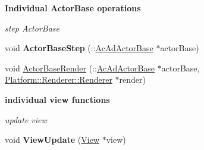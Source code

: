\begin{Indent}{\bf Individual ActorBase operations}\par
{\em \label{_amgrpbbc3c30f8b1ae7bdeff2a0b529da0242}
 step ActorBase }\begin{DoxyCompactItemize}
\item 
\hypertarget{classContent_1_1Scene_a183cddc9f57e3f2aae50197ae788e121}{
void {\bfseries ActorBaseStep} (::\hyperlink{classContent_1_1Actor_1_1Admin_1_1ActorBase}{AcAdActorBase} $\ast$actorBase)}
\label{classContent_1_1Scene_a183cddc9f57e3f2aae50197ae788e121}

\item 
void \hyperlink{classContent_1_1Scene_aa23a026de11723b0e67eeb7bf46a08c7}{ActorBaseRender} (::\hyperlink{classContent_1_1Actor_1_1Admin_1_1ActorBase}{AcAdActorBase} $\ast$actorBase, \hyperlink{classPlatform_1_1Renderer_1_1Renderer}{Platform::Renderer::Renderer} $\ast$render)
\end{DoxyCompactItemize}
\end{Indent}
\begin{Indent}{\bf individual view functions}\par
{\em \label{_amgrpc7b082c0387da43bf749d0d553895023}
 update view }\begin{DoxyCompactItemize}
\item 
\hypertarget{classContent_1_1Scene_ad4e869da34f25125c21ac0319ea0ef1f}{
void {\bfseries ViewUpdate} (\hyperlink{classContent_1_1View}{View} $\ast$view)}
\label{classContent_1_1Scene_ad4e869da34f25125c21ac0319ea0ef1f}

\end{DoxyCompactItemize}
\end{Indent}

